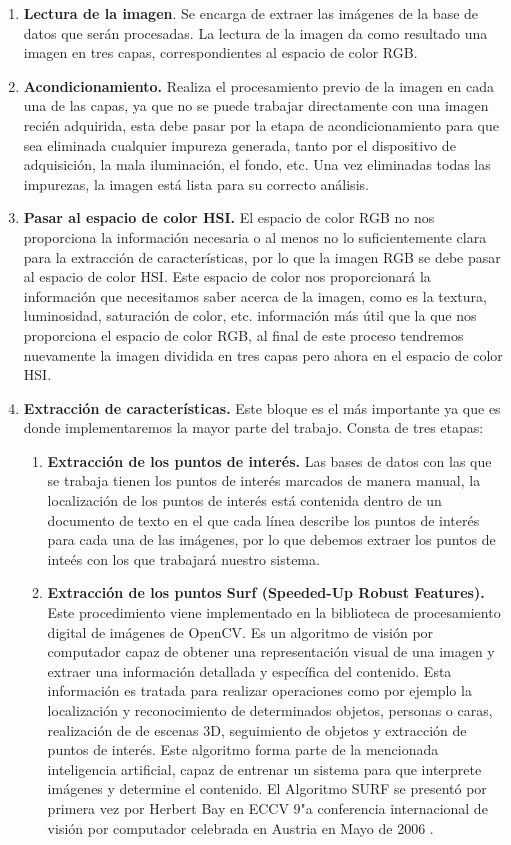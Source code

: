 \begin{enumerate}
	\item \textbf{Lectura de la imagen}. Se encarga de extraer las im\'agenes de la base de datos que ser\'an procesadas. La lectura de la imagen da como resultado una imagen en tres capas, correspondientes al espacio de color RGB.
	\item \textbf{Acondicionamiento.} Realiza el procesamiento previo de la imagen en cada una de las capas, ya que no se puede trabajar directamente con una imagen reci\'en adquirida, esta debe pasar por la etapa de acondicionamiento para que sea eliminada cualquier impureza generada, tanto por el dispositivo de adquisici\'on, la mala iluminaci\'on, el fondo, etc. Una vez eliminadas todas las impurezas, la imagen est\'a lista para su correcto an\'alisis.
	\item \textbf{Pasar al espacio de color HSI.} El espacio de color RGB no nos proporciona la informaci\'on necesaria o al menos no lo suficientemente clara para la extracci\'on de caracter\'isticas, por lo que la imagen RGB se debe pasar al espacio de color HSI. Este espacio de color nos proporcionar\'a la informaci\'on que necesitamos saber acerca de la imagen, como es la textura, luminosidad, saturaci\'on de color, etc. informaci\'on m\'as \'util que la que nos proporciona el espacio de color RGB, al final de este proceso tendremos nuevamente la imagen dividida en tres capas pero ahora en el espacio de color HSI.
	\item \textbf{Extracci\'on de caracter\'isticas.} Este bloque es el m\'as importante ya que es donde implementaremos la mayor parte del trabajo. Consta de tres etapas:
	\begin{enumerate}
		\item \textbf{Extracci\'on de los puntos de inter\'es.} Las bases de datos con las que se trabaja tienen los puntos de inter\'es marcados de manera manual, la localizaci\'on de los puntos de inter\'es est\'a contenida dentro de un documento de texto en el que cada l\'inea describe los puntos de inter\'es para cada una de las im\'agenes, por lo que debemos extraer los puntos de inte\'es con los que trabajar\'a nuestro sistema.
		\item \textbf{Extracci\'on de los puntos Surf (Speeded-Up Robust Features).} Este procedimiento viene implementado en la biblioteca de procesamiento digital de im\'agenes de OpenCV. Es un algoritmo de visi\'on por computador capaz de obtener una representaci\'on visual de una imagen y extraer una informaci\'on detallada y espec\'ifica del contenido. Esta informaci\'on es tratada para realizar operaciones como por ejemplo la localizaci\'on y reconocimiento de determinados objetos, personas o caras, realizaci\'on de de escenas 3D, seguimiento de objetos y extracci\'on de puntos de inter\'es. Este algoritmo forma parte de la mencionada inteligencia artificial, capaz de entrenar un sistema para que interprete im\'agenes y determine el contenido. El Algoritmo SURF se present\'o por primera vez por Herbert Bay en ECCV 9"a conferencia internacional de visi\'on por computador celebrada en Austria en Mayo de 2006 \cite{bay2006surf}.

\end{enumerate}
\end{enumerate}
